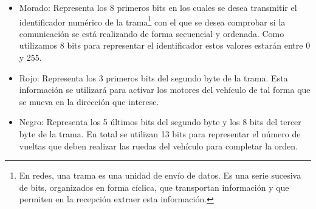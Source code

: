 \begin{itemize}
\item Morado: Representa los 8 primeros bits en los cuales se desea transmitir el identificador numérico de la trama\footnote{En redes, una trama es una unidad de envío de datos. Es una serie sucesiva de bits, organizados en forma cíclica, que transportan información y que permiten en la recepción extraer esta información.} con el que se desea comprobar si la comunicación se está realizando de forma secuencial y ordenada. Como utilizamos 8 bits para representar el identificador estos valores estarán entre 0 y 255.
\item Rojo: Representa los 3 primeros bits del segundo byte de la trama. Esta información se utilizará para activar los motores del vehículo de tal forma que se mueva en la dirección que interese.%
\item Negro: Representa los 5 últimos bits del segundo byte y los 8 bits del tercer byte de la trama. En total se utilizan 13 bits para representar el número de vueltas que deben realizar las ruedas del vehículo para completar la orden.
\end{itemize}


